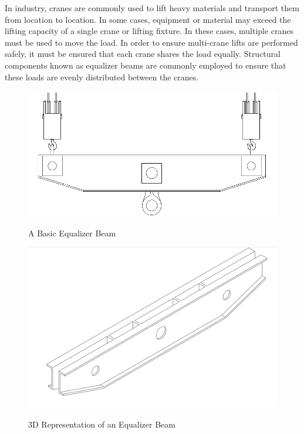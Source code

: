 
In industry, cranes are commonly used to lift heavy materials and transport them from location to location. In some cases, equipment or material may exceed the lifting capacity of a single crane or lifting fixture. In these cases, multiple cranes must be used to move the load. In order to ensure multi-crane lifts are performed safely, it must be ensured that each crane shares the load equally. Structural components known as equalizer beams are commonly employed to ensure that these loads are evenly distributed between the cranes. 


\begin{figure}[btp]
\begin{minipage}{0.5\textwidth}
\includegraphics[width=\textwidth]{img/basic_eq_beam.png}
\label{img:basic_beam}
\caption{A Basic Equalizer Beam}
\end{minipage}
\begin{minipage}{0.5\textwidth}
\includegraphics[width=\textwidth]{img/model_3d.png}
\label{img:basic_3d}
\caption{3D Representation of an Equalizer Beam}
\end{minipage}
\end{figure}


